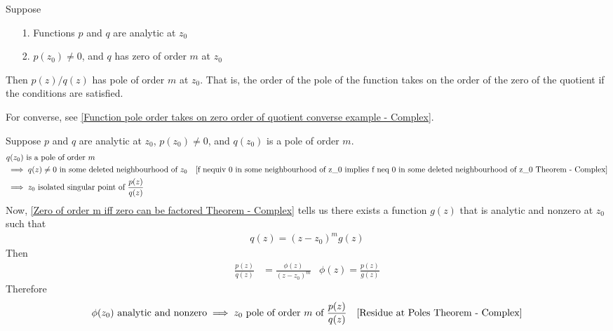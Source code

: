 \documentclass[12pt, english]{book}
\makeatletter
\renewenvironment{proof}[1][\proofname]{\par
	\pushQED{\qed}%
	\normalfont \topsep6\p@\@plus6\p@\relax
	\list{}{%
		\settowidth{\leftmargin}{\itshape\proofname:\hskip\labelsep}%
		\setlength{\labelwidth}{0pt}%
		\setlength{\itemindent}{-\leftmargin}%
		}%
	\item[\hskip\labelsep\itshape#1\@addpunct{:}]\ignorespaces
	}{\popQED\endlist\@endpefalse}
\makeatother
\begin{document}
	\begin{theorem}
		 
		\label{Function pole order takes on zero order of quotient Theorem - Complex}
		Suppose
		\begin{itemize}
			\item[1.] Functions \(p\) and \(q\) are analytic at \(z_0\)
			\item[2.] \(p(z_0) \neq 0\), and \(q\) has zero of order \(m\) at \(z_0\)
		\end{itemize}
		Then \(p(z)/q(z)\) has pole of order \(m\) at \(z_0\). That is, the order of the pole of the function takes on the order of the zero of the quotient if the conditions are satisfied.
		
		For converse, see \cref{Function pole order takes on zero order of quotient converse example - Complex}.
	\end{theorem}
	\begin{proof}
		Suppose \(p\) and \(q\) are analytic at \(z_0\), \(p(z_0) \neq 0\), and \(q(z_0)\) is a pole of order \(m\).
		\begin{align*}
			&q(z_0) \text{ is a pole of order } m \\
			&\implies q(z)\neq 0 \text{ in some deleted neighbourhood of } z_0 
				& \text{\Cref{f nequiv 0 in some neighbourhood of z_0 implies f neq 0 in some deleted neighbourhood of z_0 Theorem - Complex}} \\
			&\implies z_0 \text{ isolated singular point of } \frac{p(z)}{q(z)}
		\end{align*}
		Now, \cref{Zero of order m iff zero can be factored Theorem - Complex} tells us there exists a function \(g(z)\) that is analytic and nonzero at \(z_0\) such that
		\begin{align*}
			q(z) = (z-z_0)^m g(z)
		\end{align*}
		Then
		\begin{align*}
			\frac{p(z)}{q(z)} &= \frac{\phi(z)}{(z-z_0)^m} & \phi(z) = \frac{p(z)}{g(z)}
		\end{align*}
		Therefore
		\begin{align*}
			\phi(z_0) \text{ analytic and nonzero}
			&\implies z_0 \text{ pole of order } m \text{ of } \frac{p(z)}{q(z)}
				& \text{\Cref{Residue at Poles Theorem - Complex}}
		\end{align*}
	\end{proof}
\end{document}
